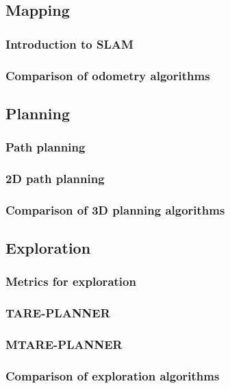 \documentclass[11pt]{article}
\begin{document}
        \subsection{Mapping}
            \subsubsection{Introduction to SLAM}
            \subsubsection{Comparison of odometry algorithms}

        \subsection{Planning}
            \subsubsection{Path planning}
            \subsubsection{2D path planning}
            \subsubsection{Comparison of 3D planning algorithms}

        \subsection{Exploration}
            \subsubsection{Metrics for exploration}
            \subsubsection{TARE-PLANNER}
            \subsubsection{MTARE-PLANNER}
            \subsubsection{Comparison of exploration algorithms}

    \newpage
\end{document}
